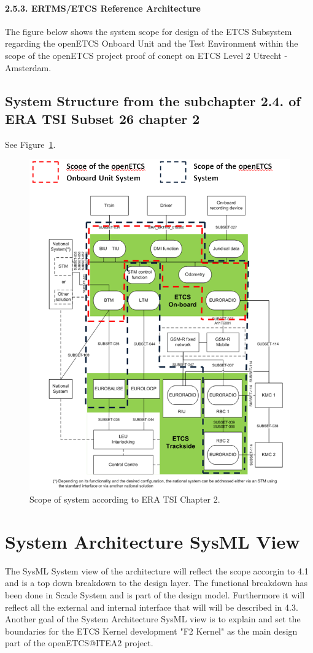 \paragraph{2.5.3. ERTMS/ETCS Reference Architecture}
The figure below shows the system scope for design of the ETCS Subsystem regarding the openETCS Onboard Unit and the Test Environment within the scope of the openETCS project proof of conept on ETCS Level 2 Utrecht - Amsterdam.

\subsection{System Structure from the subchapter 2.4. of ERA TSI Subset 26 chapter 2}
See Figure~\ref{Scope of System according to ERA TSI Chapter 2}.
\begin{figure}
\includegraphics[width=.9\textwidth]{images/ArchitectureSRS}
\caption{Scope of system according to ERA TSI Chapter 2.}
\label{Scope of System according to ERA TSI Chapter 2}
\end{figure}

\section{System Architecture SysML View}
The SysML System view of the architecture will reflect the scope accorgin to 4.1 and is a top down breakdown to the design layer. The functional breakdown has been done in Scade System and is part of the design model. Furthermore it will reflect all the external and internal interface that will will be described in 4.3. Another goal of the System Architecture SysML view is to explain and set the boundaries for the ETCS Kernel development "F2 Kernel" as the main design part of the openETCS@ITEA2 project.

